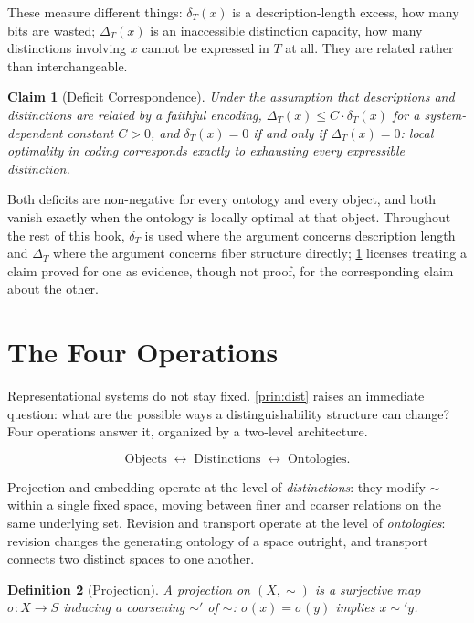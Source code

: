 \documentclass[12pt]{report}
\newtheorem{definition}{Definition}[section]
\newtheorem{claim}[definition]{Claim}
\begin{document}
These measure different things: $\delta_T(x)$ is a description-length
excess, how many bits are wasted; $\Delta_T(x)$ is an inaccessible
distinction capacity, how many distinctions involving $x$ cannot be
expressed in $T$ at all. They are related rather than interchangeable.

\begin{claim}[Deficit Correspondence]
\label{thm:deficit-correspondence}
Under the assumption that descriptions and distinctions are related by a
faithful encoding, $\Delta_T(x) \leq C \cdot \delta_T(x)$ for a
system-dependent constant $C > 0$, and $\delta_T(x) = 0$ if and only if
$\Delta_T(x) = 0$: local optimality in coding corresponds exactly to
exhausting every expressible distinction.
\end{claim}

Both deficits are non-negative for every ontology and every object, and
both vanish exactly when the ontology is locally optimal at that object.
Throughout the rest of this book, $\delta_T$ is used where the argument
concerns description length and $\Delta_T$ where the argument concerns
fiber structure directly; \cref{thm:deficit-correspondence} licenses
treating a claim proved for one as evidence, though not proof, for the
corresponding claim about the other.

\section{The Four Operations}
\label{sec:operations}

Representational systems do not stay fixed. \cref{prin:dist} raises an
immediate question: what are the possible ways a distinguishability
structure can change? Four operations answer it, organized by a
two-level architecture.

\[
\text{Objects} \;\longleftrightarrow\; \text{Distinctions}
\;\longleftrightarrow\; \text{Ontologies}.
\]

Projection and embedding operate at the level of \emph{distinctions}:
they modify $\sim$ within a single fixed space, moving between finer and
coarser relations on the same underlying set. Revision and transport
operate at the level of \emph{ontologies}: revision changes the
generating ontology of a space outright, and transport connects two
distinct spaces to one another.

\begin{definition}[Projection]
\label{def:projection}
A \emph{projection} on $(X,\sim)$ is a surjective map $\sigma : X \to S$
inducing a coarsening $\sim'$ of $\sim$: $\sigma(x) = \sigma(y)$ implies
$x \sim' y$.
\end{definition}
\end{document}
